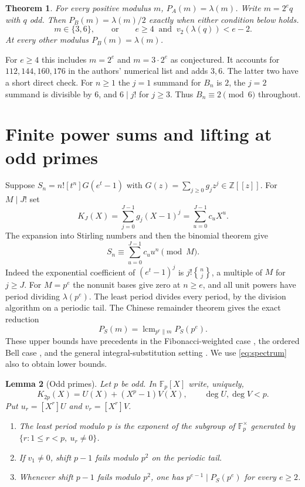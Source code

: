 \documentclass[11pt,letterpaper]{article}
\newtheorem{theorem}{Theorem}[section]
\newtheorem{lemma}[theorem]{Lemma}
\newcommand{\FF}{\mathbb F}
\newcommand{\ZZ}{\mathbb Z}
\newcommand{\lcm}{\operatorname{lcm}}
\newcommand{\stir}[2]{\genfrac{\{}{\}}{0pt}{}{#1}{#2}}
\newcommand{\coef}[1]{[X^{#1}]}
\begin{document}
\begin{theorem}\label{th:main}
For every positive modulus $m$, $P_A(m)=\lambda(m)$. Write $m=2^e q$ with
$q$ odd. Then $P_B(m)=\lambda(m)/2$ exactly when either condition below holds.
\[
 m\in\{3,6\},\qquad\text{or}\qquad
 e\ge4\ \text{ and }\ v_2(\lambda(q))<e-2.
\]
At every other modulus $P_B(m)=\lambda(m)$.
\end{theorem}

For $e\ge4$ this includes $m=2^e$ and $m=3\cdot2^e$ as conjectured.
It accounts for $112,144,160,176$ in the authors' numerical list and adds
$3,6$. The latter two have a short direct check. For $n\ge1$ the
$j=1$ summand for $B_n$ is $2$, the $j=2$ summand is divisible by $6$, and
$6\mid j!$ for $j\ge3$. Thus $B_n\equiv2\pmod6$ throughout.

\clearpage
\section{Finite power sums and lifting at odd primes}

Suppose $S_n=n![t^n]G(e^t-1)$ with $G(z)=\sum_{j\ge0}g_jz^j\in\ZZ[[z]]$.
For $M\mid J!$ set
\[
 K_J(X)=\sum_{j=0}^{J-1}g_j(X-1)^j=\sum_{u=0}^{J-1}c_uX^u.
\]
The expansion into Stirling numbers and then the binomial theorem give
\begin{equation}\label{eq:spectrum}
 S_n\equiv\sum_{u=0}^{J-1}c_u u^n\pmod M .
\end{equation}
Indeed the exponential coefficient of $(e^t-1)^j$ is $j!\stir nj$, a
multiple of $M$ for $j\ge J$. For $M=p^e$ the nonunit bases give zero at
$n\ge e$, and all unit powers have period dividing $\lambda(p^e)$. The least
period divides every period, by the division algorithm on a periodic tail.
The Chinese remainder theorem gives the exact reduction
\begin{equation}\label{eq:crt}
 P_S(m)=\lcm_{p^e\parallel m}P_S(p^e).
\end{equation}
These upper bounds have precedents in the Fibonacci-weighted case \cite{KMT},
the ordered Bell case \cite{Poonen}, and the general integral-substitution
setting \cite{Danesh}. We use \eqref{eq:spectrum} also to obtain lower bounds.

\begin{lemma}[Odd primes]\label{lem:odd}
Let $p$ be odd. In $\FF_p[X]$ write, uniquely,
\[
 K_{2p}(X)=U(X)+(X^p-1)V(X),\qquad \deg U,\deg V<p .
\]
Put $u_r=\coef r U$ and $v_r=\coef r V$.
\begin{enumerate}
\item The least period modulo $p$ is the exponent of the subgroup of
$\FF_p^\times$ generated by $\{r:1\le r<p,\ u_r\ne0\}$.
\item If $v_1\ne0$, shift $p-1$ fails modulo $p^2$ on the periodic tail.
\item Whenever shift $p-1$ fails modulo $p^2$, one has
$p^{e-1}\mid P_S(p^e)$ for every $e\ge2$.
\end{enumerate}
\end{lemma}
\end{document}
